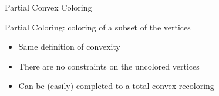 \begin{frame}{Partial Convex Coloring}
\begin{definition}
\alert{Partial Coloring}: coloring of a subset of the vertices
\end{definition}

\begin{itemize}

\pause\item
Same definition of convexity

\pause\item
There are no constraints on the uncolored vertices

\pause\item
Can be (easily) completed to a total convex recoloring
  
\end{itemize}
\pause
\end{frame}
